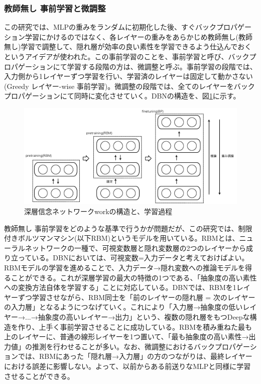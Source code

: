 \subsubsection{教師無し 事前学習と微調整}
この研究では、MLPの重みをランダムに初期化した後、すぐバックプロパゲーション学習にかけるのではなく、各レイヤーの重みをあらかじめ教師無し(教師無し)学習で調整して、隠れ層が効率の良い素性を学習できるよう仕込んでおくというアイデアが使われた。この事前学習のことを、事前学習と呼び、バックプロパゲーションにて学習する段階の方は、微調整と呼ぶ。事前学習の段階では、入力側から1レイヤーずつ学習を行い、学習済のレイヤーは固定して動かさない(Greedy レイヤー-wise 事前学習)。微調整の段階では、全てのレイヤーをバックプロパゲーションにて同時に変化させていく。DBNの構造を、図\ref{c3_dbn}に示す。\par
\begin{figure}[tbp]
 \centering
  \includegraphics[width=120mm]{img/c3/dbn}
 \caption{深層信念ネットワークworkの構造と、学習過程}
 \label{c3_dbn}
\end{figure}
教師無し 事前学習をどのような基準で行うかが問題だが、この研究では、制限付きボルツマンマシン(以下RBM)というモデルを用いている。RBMとは、ニューラルネットワークの一種で、可視変数層と隠れ変数層の2つのレイヤーから成り立っている。DBNにおいては、可視変数=入力データと考えておけばよい。RBMモデルの学習を進めることで、入力データ→隠れ変数への推論モデルを得ることができる。これが深層学習の最大の特徴の1つである、「抽象度の高い素性への変換方法自体を学習する」ことに対応している。DBNでは、RBMを1レイヤーずつ学習させながら、RBM同士を「前のレイヤーの隠れ層 = 次のレイヤーの入力層」となるようにつなげていく。これにより「入力層→抽象度の低いレイヤー→...→抽象度の高いレイヤー→出力」という、複数の隠れ層をもつDeepな構造を作り、上手く事前学習させることに成功している。RBMを積み重ねた最も上のレイヤーに、普通の線形レイヤーを1つ置いて、「最も抽象度の高い素性→出力値」の推測を行わせることが多い。なお、微調整におけるバックプロパゲーションでは、RBMにあった「隠れ層→入力層」の方のつながりは、最終レイヤーにおける誤差に影響しない。よって、以前からある前送りなMLPと同様に学習させることができる。
